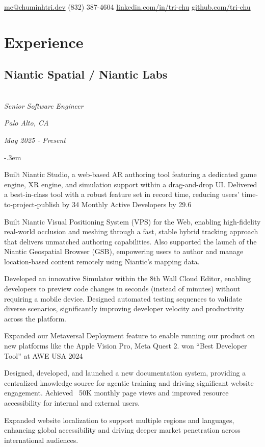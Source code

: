 \documentclass{article}
\makeatletter
\def\faEmail{{\FAFR \symbol{"F0E0}}} %
\def\faPhone{{\FAFR \symbol{"F095}}} %
\def\faLinkedin{{\FAB \symbol{"F08C}}} %
\def\faGithub{{\FAB \symbol{"F09B}}} %
\let\olditemize=\itemize \let\endolditemize=\enditemize
\renewenvironment{itemize}{\olditemize[topsep=0em] \itemsep-.3em}{\endolditemize}
\newcommand{\link}[1]{\href{https://#1}{#1}}
\newenvironment{twocolentry}[2][]{
    \def\secondColumn{#2}
    \raggedright
    \setcolumnwidth{\fill, 6cm}
    \begin{paracol}{2}
}{
    \switchcolumn \raggedleft \secondColumn
    \end{paracol}
} %
\renewcommand{\maketitle}{
  \begin{flushleft}
    \Huge\bfseries\theauthor
  \end{flushleft}
  \begin{bfseries}
    \faEmail    \hspace{1pt} \href{mailto:me@chuminhtri.dev}{me@chuminhtri.dev} \quad
    \faPhone    \hspace{1pt} (832) 387-4604 \quad
    \faLinkedin \hspace{1pt} \link{linkedin.com/in/tri-chu} \quad
    \faGithub   \hspace{1pt} \link{github.com/tri-chu}
  \end{bfseries}
}
\makeatother
\begin{document}
\author{\color{accentcolor}Tri Chu}
\maketitle


\section{Experience}

\begin{twocolentry}{
  \textit{Palo Alto, CA}

  \textit{May 2025 - Present}
}
\subsection{Niantic Spatial / Niantic Labs}\hfill\\

\textit{Senior Software Engineer}
\end{twocolentry}

\begin{itemize}
  \item Built Niantic Studio, a web-based AR authoring tool featuring a dedicated game engine, XR
  engine, and simulation support within a drag-and-drop UI. Delivered a best-in-class tool with a
  robust feature set in record time, reducing users’ time-to-project-publish by 34%
  Monthly Active Developers by 29.6%
  \item Built Niantic Visual Positioning System (VPS) for the Web, enabling high-fidelity real-world
  occlusion and meshing through a fast, stable hybrid tracking approach that delivers unmatched
  authoring capabilities. Also supported the launch of the Niantic Geospatial Browser (GSB),
  empowering users to author and manage location-based content remotely using Niantic’s mapping
  data.
  \item Developed an innovative Simulator within the 8th Wall Cloud Editor, enabling developers to
  preview code changes in seconds (instead of minutes) without requiring a mobile device. Designed
  automated testing sequences to validate diverse scenarios, significantly improving developer
  velocity and productivity across the platform.
  \item Expanded our Metaversal Deployment feature to enable running our product on new platforms
  like the Apple Vision Pro, Meta Quest 2. won “Best Developer Tool” at AWE USA 2024
  \item Designed, developed, and launched a new documentation system, providing a centralized
  knowledge source for agentic training and driving significant website engagement. Achieved ~50K
  monthly page views and improved resource accessibility for internal and external users.
  \item Expanded website localization to support multiple regions and languages, enhancing global
  accessibility and driving deeper market penetration across international audiences.
\end{itemize}
\end{document}
